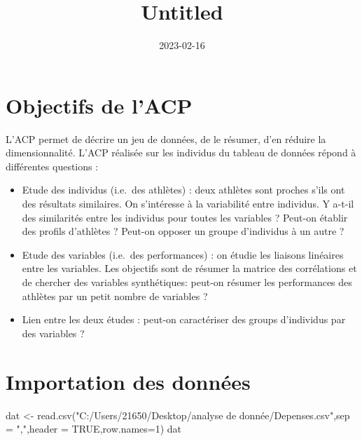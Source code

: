 \documentclass[
]{article}
\title{Untitled}
\author{}
\date{\vspace{-2.5em}2023-02-16}
\newenvironment{Shaded}{\begin{snugshade}}{\end{snugshade}}
\newcommand{\AttributeTok}[1]{\textcolor[rgb]{0.77,0.63,0.00}{#1}}
\newcommand{\ConstantTok}[1]{\textcolor[rgb]{0.00,0.00,0.00}{#1}}
\newcommand{\DecValTok}[1]{\textcolor[rgb]{0.00,0.00,0.81}{#1}}
\newcommand{\FunctionTok}[1]{\textcolor[rgb]{0.00,0.00,0.00}{#1}}
\newcommand{\NormalTok}[1]{#1}
\newcommand{\OtherTok}[1]{\textcolor[rgb]{0.56,0.35,0.01}{#1}}
\newcommand{\StringTok}[1]{\textcolor[rgb]{0.31,0.60,0.02}{#1}}
\begin{document}
\maketitle

\hypertarget{objectifs-de-lacp}{%
\section{Objectifs de l'ACP}\label{objectifs-de-lacp}}

L'ACP permet de décrire un jeu de données, de le résumer, d'en réduire
la dimensionnalité. L'ACP réalisée sur les individus du tableau de
données répond à différentes questions :

\begin{itemize}
\item
  Etude des individus (i.e.~des athlètes) : deux athlètes sont proches
  s'ils ont des résultats similaires. On s'intéresse à la variabilité
  entre individus. Y a-t-il des similarités entre les individus pour
  toutes les variables ? Peut-on établir des profils d'athlètes ?
  Peut-on opposer un groupe d'individus à un autre ?
\item
  Etude des variables (i.e.~des performances) : on étudie les liaisons
  linéaires entre les variables. Les objectifs sont de résumer la
  matrice des corrélations et de chercher des variables synthétiques:
  peut-on résumer les performances des athlètes par un petit nombre de
  variables ?
\item
  Lien entre les deux études : peut-on caractériser des groups
  d'individus par des variables ?
\end{itemize}

\hypertarget{importation-des-donnuxe9es}{%
\section{Importation des données}\label{importation-des-donnuxe9es}}

\begin{Shaded}
\begin{Highlighting}[]
\NormalTok{dat }\OtherTok{\textless{}{-}} \FunctionTok{read.csv}\NormalTok{(}\StringTok{"C:/Users/21650/Desktop/analyse de donnée/Depenses.csv"}\NormalTok{,}\AttributeTok{sep =} \StringTok{","}\NormalTok{,}\AttributeTok{header =} \ConstantTok{TRUE}\NormalTok{,}\AttributeTok{row.names=}\DecValTok{1}\NormalTok{)}
\NormalTok{dat}
\end{Highlighting}
\end{Shaded}
\end{document}
